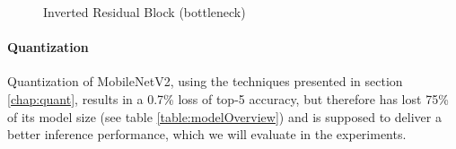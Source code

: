 \begin{figure}[!htb]
\centering
   \resizebox{.7\linewidth}{!}{}
\caption{Inverted Residual Block (bottleneck)}
\label{fig:bottleneckBlock}
\end{figure}

\paragraph{Quantization}
Quantization of MobileNetV2, using the techniques presented in section \ref{chap:quant}, results in a  0.7\% loss of top-5 accuracy, but therefore has lost 75\% of its model size (see table \ref{table:modelOverview}) and is supposed to deliver a better inference performance, which we will evaluate in the experiments.



